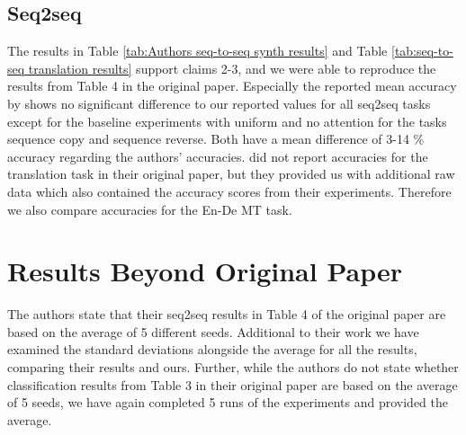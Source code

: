 \subsection{Seq2seq}
The results in Table \ref{tab:Authors seq-to-seq synth results} and Table \ref{tab:seq-to-seq translation results} support claims 2-3, and we were able to reproduce the results from Table 4 in the original paper. Especially the reported mean accuracy by \cite{pruthi-etal-2020-learning} shows no significant difference to our reported values for all seq2seq tasks except for the baseline experiments with uniform and no attention for the tasks sequence copy and sequence reverse. Both have a mean difference of 3-14 \% accuracy regarding the authors' accuracies. \citet{pruthi-etal-2020-learning} did not report accuracies for the translation task in their original paper, but they provided us with additional raw data which also contained the accuracy scores from their experiments. Therefore we also compare accuracies for the En-De MT task.

\section{Results Beyond Original Paper}

The authors state that their seq2seq results in Table 4 of the original paper are based on the average of 5 different seeds. Additional to their work we have examined the standard deviations alongside the average for all the results, comparing their results and ours. Further, while the authors do not state whether classification results from Table 3 in their original paper are based on the average of 5 seeds, we have again completed 5 runs of the experiments and provided the average.

